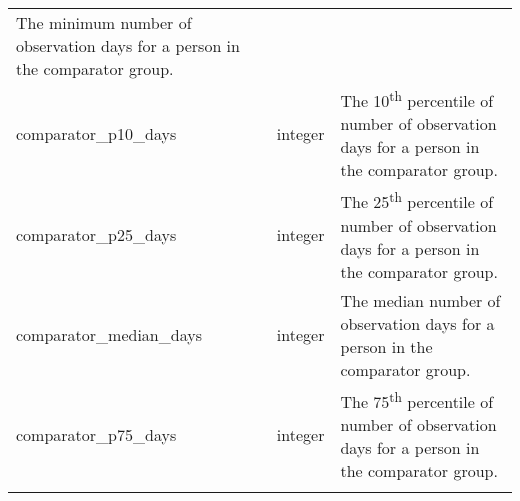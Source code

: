 \documentclass[
]{article}
\begin{document}
\begin{longtable}[]{@{}lll@{}}
\begin{minipage}[t]{0.50\columnwidth}
The minimum number of observation days for a person in the comparator
group.\strut
\end{minipage}\tabularnewline
\begin{minipage}[t]{0.23\columnwidth}\raggedright
comparator\_p10\_days\strut
\end{minipage} & \begin{minipage}[t]{0.18\columnwidth}\raggedright
integer\strut
\end{minipage} & \begin{minipage}[t]{0.50\columnwidth}\raggedright
The 10\textsuperscript{th} percentile of number of observation days for
a person in the comparator group.\strut
\end{minipage}\tabularnewline
\begin{minipage}[t]{0.23\columnwidth}\raggedright
comparator\_p25\_days\strut
\end{minipage} & \begin{minipage}[t]{0.18\columnwidth}\raggedright
integer\strut
\end{minipage} & \begin{minipage}[t]{0.50\columnwidth}\raggedright
The 25\textsuperscript{th} percentile of number of observation days for
a person in the comparator group.\strut
\end{minipage}\tabularnewline
\begin{minipage}[t]{0.23\columnwidth}\raggedright
comparator\_median\_days\strut
\end{minipage} & \begin{minipage}[t]{0.18\columnwidth}\raggedright
integer\strut
\end{minipage} & \begin{minipage}[t]{0.50\columnwidth}\raggedright
The median number of observation days for a person in the comparator
group.\strut
\end{minipage}\tabularnewline
\begin{minipage}[t]{0.23\columnwidth}\raggedright
comparator\_p75\_days\strut
\end{minipage} & \begin{minipage}[t]{0.18\columnwidth}\raggedright
integer\strut
\end{minipage} & \begin{minipage}[t]{0.50\columnwidth}\raggedright
The 75\textsuperscript{th} percentile of number of observation days for
a person in the comparator group.\strut
\end{minipage}\tabularnewline
\begin{minipage}[t]{0.23\columnwidth}\raggedright

\end{minipage}
\end{longtable}
\end{document}
